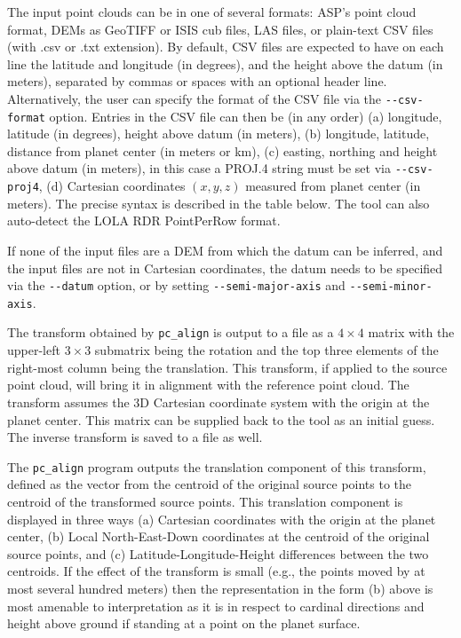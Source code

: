 The input point clouds can be in one of several formats: ASP's point
cloud format, DEMs as GeoTIFF or ISIS cub files, LAS files, or
plain-text CSV files (with .csv or .txt extension). By default, CSV
files are expected to have on each line the latitude and longitude (in
degrees), and the height above the datum (in meters), separated by
commas or spaces with an optional header line. Alternatively, the user
can specify the format of the CSV file via the \texttt{-\/-csv-format}
option. Entries in the CSV file can then be (in any order) (a)
longitude, latitude (in degrees), height above datum (in meters), (b)
longitude, latitude, distance from planet center (in meters or km), (c)
easting, northing and height above datum (in meters), in this case
a PROJ.4 string must be set via \texttt{-\/-csv-proj4}, (d)
Cartesian coordinates $(x, y, z)$ measured from planet center (in
meters). The precise syntax is described in the table below. The tool
can also auto-detect the LOLA RDR PointPerRow format.

If none of the input files are a DEM from which the datum can be
inferred, and the input files are not in Cartesian coordinates, the
datum needs to be specified via the \texttt{-\/-datum} option, or by
setting \texttt{-\/-semi-major-axis} and \texttt{-\/-semi-minor-axis}.

The transform obtained by \texttt{pc\_align} is output to a file as a
$4\times 4$ matrix with the upper-left $3\times 3$ submatrix being the
rotation and the top three elements of the right-most column being the
translation. This transform, if applied to the source point cloud, will
bring it in alignment with the reference point cloud. The transform
assumes the 3D Cartesian coordinate system with the origin at the planet
center. This matrix can be supplied back to the tool as an initial
guess. The inverse transform is saved to a file as well.

The \texttt{pc\_align} program outputs the translation component of this
transform, defined as the vector from the centroid of the original
source points to the centroid of the transformed source points. This
translation component is displayed in three ways (a) Cartesian
coordinates with the origin at the planet center, (b) Local
North-East-Down coordinates at the centroid of the original source
points, and (c) Latitude-Longitude-Height differences between the two
centroids. If the effect of the transform is small (e.g., the points
moved by at most several hundred meters) then the representation in the
form (b) above is most amenable to interpretation as it is in respect
to cardinal directions and height above ground if standing at a point on
the planet surface.

